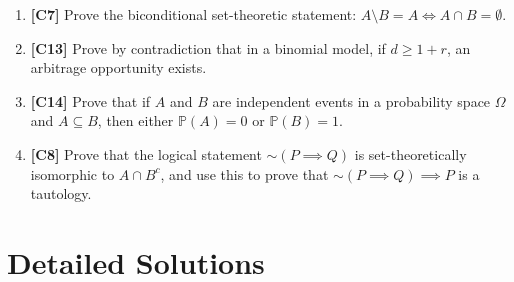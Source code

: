 \documentclass[11pt]{article}
\begin{document}
\begin{enumerate}
    \item \textbf{[C7]} Prove the biconditional set-theoretic statement: $A \setminus B = A \iff A \cap B = \emptyset$.
    \item \textbf{[C13]} Prove by contradiction that in a binomial model, if $d \ge 1+r$, an arbitrage opportunity exists.
    \item \textbf{[C14]} Prove that if $A$ and $B$ are independent events in a probability space $\Omega$ and $A \subseteq B$, then either $\mathbb{P}(A) = 0$ or $\mathbb{P}(B) = 1$.
    \item \textbf{[C8]} Prove that the logical statement $\sim(P \implies Q)$ is set-theoretically isomorphic to $A \cap B^c$, and use this to prove that $\sim(P \implies Q) \implies P$ is a tautology.
\end{enumerate}

\newpage

\section{Detailed Solutions}
\label{sec:solutions}
\end{document}
